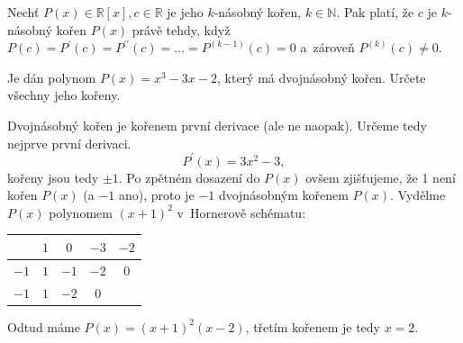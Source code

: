 \begin{veta}
    Nechť $P(x) \in \mathbb R[x], c \in \mathbb R$ je jeho $k$-násobný kořen, $k\in \mathbb N.$ Pak platí, že $c$ je
    $k$-násobný kořen $P(x)$ právě tehdy, když $P(c)=P^\prime(c)=P^{\prime \prime}(c)=\dots= P^{(k-1)}(c)=0$ a~zároveň $P^{(k)}(c)\ne 0$.
\end{veta}


\begin{priklad}
Je dán polynom $P(x)=x^3-3x-2$, který má dvojnásobný kořen.
Určete všechny jeho kořeny.
\end{priklad}

\begin{reseni}
Dvojnásobný kořen je kořenem první derivace (ale ne naopak). Určeme tedy nejprve první derivaci.
\begin{equation*}
	P^\prime(x)=3x^2-3,
\end{equation*}
kořeny jsou tedy $\pm 1$. Po zpětném dosazení do $P(x)$ ovšem zjišťujeme, že 1 není kořen $P(x)$
(a $-1$ ano), proto je $-1$ dvojnásobným kořenem $P(x)$. Vydělme $P(x)$ polynomem $(x+1)^2$ v~Hornerově
schématu:
\begin{center}
	\begin{tabular}{c | c c c c}
		\, & $1$ & $0$ & $-3$ & $-2$\\
		\hline
		$-1$ & $1$ & $-1$ & $-2$ & $0$\\
		\hline
		$-1$ & $1$ & $-2$ & $0$ & \,\\
	\end{tabular}
\end{center}
Odtud máme $P(x)=(x+1)^2(x-2)$, třetím kořenem je tedy $x=2$.
\end{reseni}
